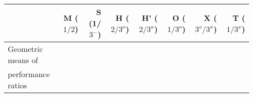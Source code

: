\begin{tabular}{l*{7}{r}}\toprule
&M ($1/2$) &S (1/$3^-$)&H ($2/3^o$)&H' ($2/3^x$)&O ($1/3^o$)&X ($3^o/3^x$)&T ($1/3^x$)\\\midrule
Geometric means of\\
performance ratios
}
\addlinespace
\bottomrule
\end{tabular}
